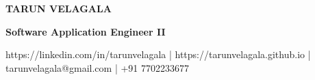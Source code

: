 \begin{center}
    {\LARGE\textbf{TARUN VELAGALA}}\\

    \vspace{0.125 cm}

    {\textbf{ Software Application Engineer II }}\\

    \vspace{0.125 cm}

    \textnormal{\small https://linkedin.com/in/tarunvelagala} |
    \textnormal{\small https://tarunvelagala.github.io} |
    \textnormal{\small tarunvelagala@gmail.com} |
    \textnormal{\small +91 7702233677}
\end{center}
